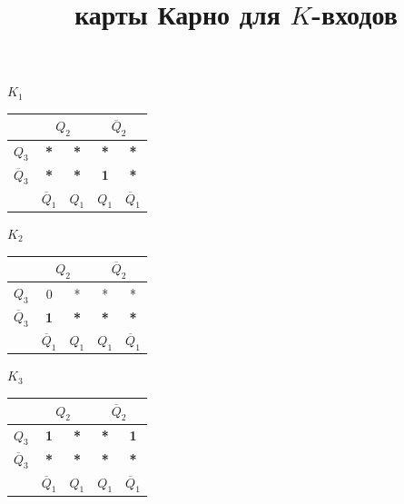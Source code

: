 \documentclass[14pt, a4paper]{extarticle}
\begin{document}
\vspace{0.3cm}

\begin{center}
	\small	
	\begin{minipage}{0.32\textwidth}
		\centering
		\textbf{$K_1$}\\[4pt]
		\begin{tabular}{|c|c|c|c|c|}
			\hline
			& \multicolumn{2}{c|}{$Q_2$} & \multicolumn{2}{c|}{$\overline{Q}_2$} \\ \hline
			$Q_3$ & \textbf{*} & \textbf{*} & \textbf{*} & \textbf{*} \\ \hline
			$\overline{Q}_3$ & \textbf{*} & \textbf{*} & \textbf{1} & \textbf{*} \\ \hline
			& $\overline{Q}_1$ & $Q_1$ & $Q_1$ & $\overline{Q}_1$ \\ \hline
		\end{tabular}
	\end{minipage}
	\hfill
	\begin{minipage}{0.32\textwidth}
		\centering
		\textbf{$K_2$}\\[4pt]
		\begin{tabular}{|c|c|c|c|c|}
			\hline
			& \multicolumn{2}{c|}{$Q_2$} & \multicolumn{2}{c|}{$\overline{Q}_2$} \\ \hline
			$Q_3$ & 0 & * & * & * \\ \hline
			$\overline{Q}_3$ & \textbf{1} & \textbf{*} & \textbf{*} & \textbf{*} \\ \hline
			& $\overline{Q}_1$ & $Q_1$ & $Q_1$ & $\overline{Q}_1$ \\ \hline
		\end{tabular}
	\end{minipage}
	\hfill
	\begin{minipage}{0.32\textwidth}
		\centering
		\textbf{$K_3$}\\[4pt]
		\begin{tabular}{|c|c|c|c|c|}
			\hline
			& \multicolumn{2}{c|}{$Q_2$} & \multicolumn{2}{c|}{$\overline{Q}_2$} \\ \hline
			$Q_3$ & \textbf{1} & \textbf{*} & \textbf{*} & \textbf{1} \\ \hline
			$\overline{Q}_3$ & \textbf{*} & \textbf{*} & \textbf{*} & \textbf{*} \\ \hline
			& $\overline{Q}_1$ & $Q_1$ & $Q_1$ & $\overline{Q}_1$ \\ \hline
		\end{tabular}
	\end{minipage}
	\title{карты Карно для $K$-входов}
\end{center}
\end{document}
